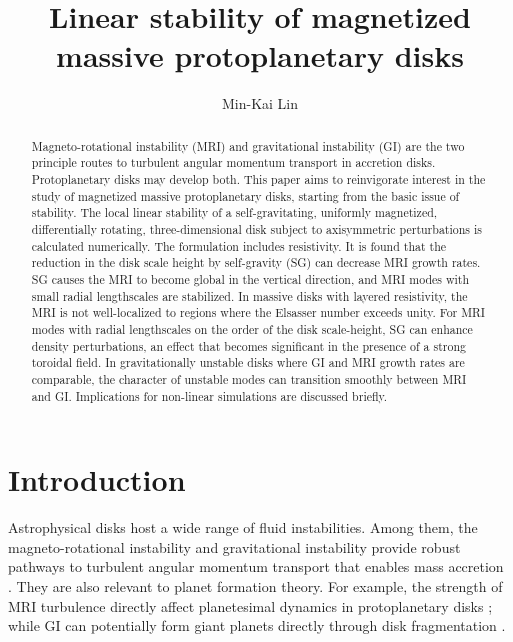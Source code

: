 \documentclass[iop]{emulateapj}
\begin{document}
\title{Linear stability of magnetized massive protoplanetary disks}


\author{Min-Kai Lin }%

\begin{abstract}
  Magneto-rotational instability (MRI) and gravitational instability
  (GI) are the two principle routes to turbulent angular momentum
  transport in accretion disks. Protoplanetary disks may develop 
  both. This paper aims to reinvigorate interest in the study of
  magnetized  massive protoplanetary disks, starting from the basic
  issue of stability. The local linear stability of a 
  self-gravitating, uniformly magnetized, differentially rotating, 
  three-dimensional disk subject to axisymmetric perturbations is
  calculated numerically. The formulation includes 
  resistivity. It is found that the reduction in the disk scale height
  by self-gravity (SG) can decrease MRI growth rates. SG causes the MRI to
  become global in the vertical direction, and MRI modes
  with small radial lengthscales are stabilized. In massive
  disks with layered resistivity, the MRI is not well-localized
  to regions where the Elsasser number exceeds unity. For MRI modes
  with radial lengthscales on the order of the disk scale-height, SG
  can enhance density perturbations, an effect that becomes 
  significant in the presence of a strong toroidal field. In
  gravitationally unstable disks where GI and MRI growth rates are
  comparable, the character of unstable modes can transition smoothly
  between MRI and GI. Implications for non-linear simulations are
  discussed briefly.   

%
\end{abstract}

\section{Introduction}
Astrophysical disks host a wide range of fluid instabilities. Among
them, the magneto-rotational instability \citep[MRI,][]{chandrasekhar61,
  balbus91,balbus98} %
and gravitational instability \citep[GI, ][]{toomre64,goldreich65a,goldreich65b} 
provide robust pathways to turbulent angular momentum transport that
enables mass accretion \citep[][ 
  and references therein]{balbus99,armitage11,turner14}.   
They are also relevant to planet formation theory. For example,
the strength of MRI turbulence directly affect planetesimal dynamics
in protoplanetary disks \citep{yang12,gressel12}; while GI can
potentially form giant planets directly through disk fragmentation
\citep{boss97,boss98,gammie01,voro13,helled14}. 
\end{document}
